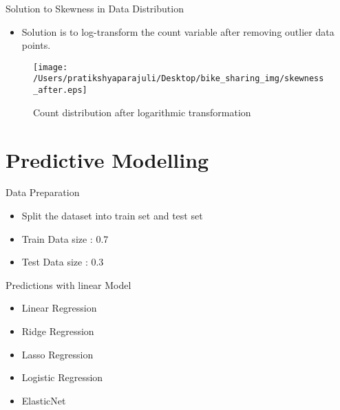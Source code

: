 \documentclass[
 size=14pt,
 paper=smartboard,  %
 mode=present, 		%
 display=slides, 	%
 style=tuliplab,  	%
 pauseslide,
 fleqn,leqno]{powerdot}
\begin{document}
  \begin{slide}[toc=,bm=]{ Solution to Skewness in Data Distribution}

    \begin{itemize}
    \item Solution is to log-transform the count variable after removing outlier data points.
    \end{itemize}
    \begin{figure}
      \centering
      \centerline{\texttt{[image: /Users/pratikshyaparajuli/Desktop/bike\_sharing\_img/skewness\_after.eps]}}
      \caption{Count distribution after logarithmic transformation}\label{fig:Count distribution after logarithmic transformation}
    \end{figure}
    \end{slide}

    
\section{Predictive Modelling}


\begin{slide}[toc=,bm=]{Data Preparation}
  
  \begin{itemize}
  \item Split the dataset into train set and test set
  \item Train Data size : 0.7
  \item Test Data size : 0.3
  
  \end{itemize}
  
  \end{slide}
  

\begin{slide}[toc=,bm=]{Predictions with linear Model}
\begin{itemize}
\item Linear Regression
\item Ridge Regression
\item Lasso Regression
\item Logistic Regression
\item ElasticNet

\end{itemize}

\end{slide}
\end{document}
